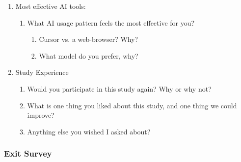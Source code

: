 \documentclass{article}
\begin{document}
\begin{instructionbox}
\begin{enumerate}
    \item Most effective AI tools:
    \begin{enumerate}
        \item What AI usage pattern feels the most effective for you?
        \begin{enumerate}
            \item Cursor vs. a web-browser? Why?
            \item What model do you prefer, why?
        \end{enumerate}
    \end{enumerate}
    \item Study Experience
    \begin{enumerate}
        \item Would you participate in this study again? Why or why not?
        \item What is one thing you liked about this study, and one thing we could improve?
        \item Anything else you wished I asked about?
    \end{enumerate}
\end{enumerate}

\end{instructionbox}



\subsubsection{Exit Survey}
\label{sec:exit_interviews}
\end{document}
